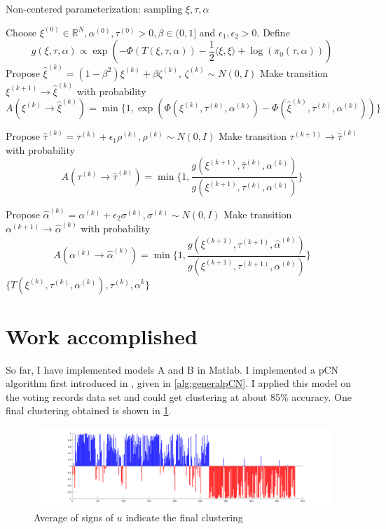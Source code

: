 \documentclass{siamart1116}
\begin{document}
\begin{algorithm}
\caption{Non-centered parameterization: sampling $\xi, \tau, \alpha$}
\label{alg:xi_tau_alpha}
\begin{algorithmic}
\State Choose $\xi^{(0)} \in \mathbb{R}^N, \alpha^{(0)}, \tau^{(0)} > 0, \beta \in (0, 1]$ and $\epsilon_1, \epsilon_2 > 0$.
\State Define \[ g(\xi,\tau,\alpha) \propto \exp\left( -\Phi(T(\xi,\tau,\alpha))-\frac{1}{2}\langle \xi,\xi \rangle + \log(\pi_0(\tau,\alpha)) \right)\]
\State Propose $\hat\xi^{(k)} = (1-\beta^2)\xi^{(k)} + \beta \zeta^{(k)}$, $\zeta^{(k)} \sim N(0, I)$
\State Make transition $\xi^{(k+1)} \to \hat\xi^{(k)}$ with probability
\[ A(\xi^{(k)} \to \hat\xi^{(k)}) = \min\{1, \exp\left(\Phi(\xi^{(k)},\tau^{(k)},\alpha^{(k)}) - \Phi(\hat\xi^{(k)},\tau^{(k)},\alpha^{(k)})\right) \}\]

\State Propose $\hat\tau^{(k)} = \tau^{(k)} + \epsilon_1 \rho^{(k)}, \rho^{(k)} \sim N(0,I)$
\State Make transition $\tau^{(k+1)} \to \hat\tau^{(k)}$ with probability
\[ A(\tau^{(k)} \to \hat\tau^{(k)}) = \min\{1, \frac{g(\xi^{(k+1)},\hat\tau^{(k)},\alpha^{(k)})}{g(\xi^{(k+1)},\tau^{(k)},\alpha^{(k)})} \}\]

\State Propose $\hat\alpha^{(k)} = \alpha^{(k)} + \epsilon_2 \sigma^{(k)}, \sigma^{(k)} \sim N(0,I)$
\State Make transition $\alpha^{(k+1)} \to \hat\alpha^{(k)}$ with probability
\[ A(\alpha^{(k)} \to \hat\alpha^{(k)}) = \min\{1, \frac{g(\xi^{(k+1)},\tau^{(k+1)},\hat \alpha^{(k)})}{g(\xi^{(k+1)},\tau^{(k+1)},\alpha^{(k)})} \}\]
\EndFor
\State \Return $\{ T(\xi^{(k)},\tau^{(k)},\alpha^{(k)}), \tau^{(k)}, \alpha^{k} \}$
\end{algorithmic}
\end{algorithm}




\section{Work accomplished}
So far, I have implemented models A and B in Matlab. I implemented a pCN algorithm first introduced in \cite{BeRoStVo08}, given in \cref{alg:generalpCN}.
I applied this model on the voting records data set and could get clustering at about 85\% accuracy. One final clustering obtained is shown in \cref{fig:mcmc_gamma_final}.
\begin{figure}[!htb]
\label{fig:mcmc_gamma_final}
\caption{Average of signs of $u$ indicate the final clustering}
\includegraphics[width = \linewidth]{mcmc_gamma/manycorrect_clustering.png}
\end{figure}
\end{document}
